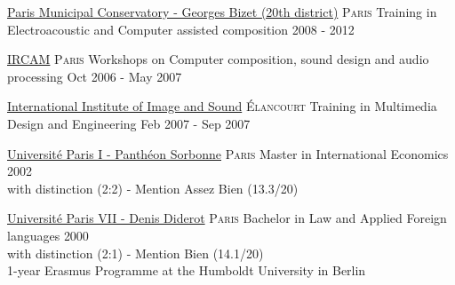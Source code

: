 \documentclass[10pt,a4paper]{article}
\begin{document}
\headedsection
  {\href{http://equipement.paris.fr/conservatoire-municipal-georges-bizet-1635}{Paris Municipal Conservatory - Georges Bizet (20th district)}}
  {\textsc{Paris}} {%
  \headedsubsection
    {Training in Electroacoustic and Computer assisted composition}
    {2008 - 2012}
    {
    }
}

\vspace{0.7em}

\headedsection
  {\href{http://www.ircam.fr/}{IRCAM}}
  {\textsc{Paris}} {%
  \headedsubsection
    {Workshops on Computer composition, sound design and audio processing}
    {Oct 2006 - May 2007}
    {
    }
}

\vspace{0.7em}

\headedsection
  {\href{https://www.3is-education.fr}{International Institute of Image and Sound}}
  {\textsc{\'Elancourt}} {%
  \headedsubsection
    {Training in Multimedia Design and Engineering}
    {Feb 2007 - Sep 2007}
    {
    }
}

\vspace{0.7em}

\headedsection
  {\href{http://www.univ-paris1.fr/}{Universit\'e Paris I - Panth\'eon Sorbonne}}
  {\textsc{Paris}} {%
  \headedsubsection
    {Master in International Economics}
    {2002}
    {\\with distinction (2:2) - Mention Assez Bien (13.3/20)%
    }
}

\vspace{0.7em}

\headedsection
  {\href{https://u-paris.fr}{Universit\'e Paris VII - Denis Diderot}}
  {\textsc{Paris}} {%
  \headedsubsection
    {Bachelor in Law and Applied Foreign languages}
    {2000}
    {\\with distinction (2:1) - Mention Bien (14.1/20)
    \\1-year Erasmus Programme at the Humboldt University in Berlin
    }
}
\end{document}
